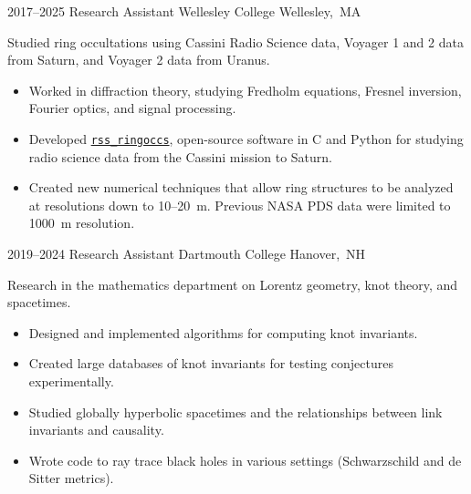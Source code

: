 \documentclass[letterpaper,sans]{moderncv}
\begin{document}
        \cventry%
            {2017--2025}
            {Research Assistant}
            {Wellesley College}
            {\mbox{Wellesley, MA}}
            {}
            {%
                Studied ring occultations using Cassini Radio Science
                data, Voyager 1 and 2 data from Saturn, and Voyager 2
                data from Uranus.
                \begin{itemize}
                    \item
                        Worked in diffraction theory, studying Fredholm
                        equations, Fresnel inversion, Fourier optics,
                        and signal processing.
                    \item
                        Developed
                        \href{%
                            https://github.com/NASA-Planetary-Science/%
                                rss_ringoccs%
                        }{\texttt{rss\_ringoccs}},
                        open-source software in C and Python for
                        studying radio science data from the
                        Cassini mission to Saturn.
                    \item
                        Created new numerical techniques that allow ring
                        structures to be analyzed at resolutions down to
                        10--20~m. Previous NASA PDS data were limited
                        to 1000~m resolution.
                \end{itemize}
            }
        \cventry%
            {2019--2024}
            {Research Assistant}
            {Dartmouth College}
            {\mbox{Hanover, NH}}
            {}
            {%
                Research in the mathematics department on Lorentz geometry,
                knot theory, and spacetimes.
                \begin{itemize}
                    \item
                        Designed and implemented algorithms for
                        computing knot invariants.
                    \item
                        Created large databases of knot invariants for
                        testing conjectures experimentally.
                    \item
                        Studied globally hyperbolic spacetimes and the
                        relationships between link invariants and
                        causality.
                    \item
                        Wrote code to ray trace black holes in
                        various settings (Schwarzschild and de
                        Sitter metrics).
                \end{itemize}
            }
\end{document}
